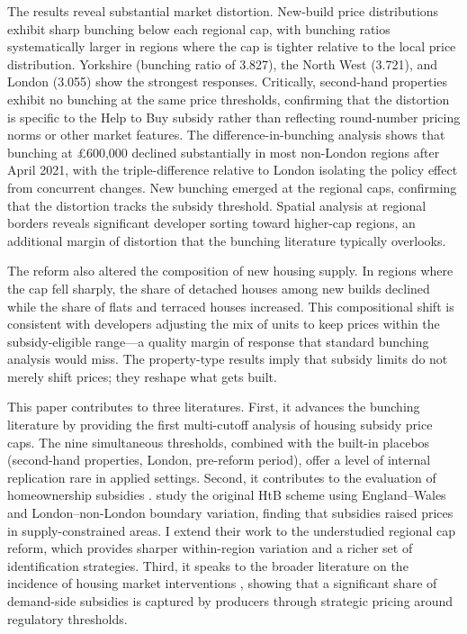 \documentclass[12pt]{article}
\begin{document}
The results reveal substantial market distortion. New-build price distributions exhibit sharp bunching below each regional cap, with bunching ratios systematically larger in regions where the cap is tighter relative to the local price distribution. Yorkshire (bunching ratio of 3.827), the North West (3.721), and London (3.055) show the strongest responses. Critically, second-hand properties exhibit no bunching at the same price thresholds, confirming that the distortion is specific to the Help to Buy subsidy rather than reflecting round-number pricing norms or other market features. The difference-in-bunching analysis shows that bunching at \pounds600,000 declined substantially in most non-London regions after April 2021, with the triple-difference relative to London isolating the policy effect from concurrent changes. New bunching emerged at the regional caps, confirming that the distortion tracks the subsidy threshold. Spatial analysis at regional borders reveals significant developer sorting toward higher-cap regions, an additional margin of distortion that the bunching literature typically overlooks.

The reform also altered the composition of new housing supply. In regions where the cap fell sharply, the share of detached houses among new builds declined while the share of flats and terraced houses increased. This compositional shift is consistent with developers adjusting the mix of units to keep prices within the subsidy-eligible range---a quality margin of response that standard bunching analysis would miss. The property-type results imply that subsidy limits do not merely shift prices; they reshape what gets built.

This paper contributes to three literatures. First, it advances the bunching literature \citep{kleven2016bunching, kleven2013using} by providing the first multi-cutoff analysis of housing subsidy price caps. The nine simultaneous thresholds, combined with the built-in placebos (second-hand properties, London, pre-reform period), offer a level of internal replication rare in applied settings. Second, it contributes to the evaluation of homeownership subsidies \citep{mian2009consequences, berger2020stimulating, carozzi2024help}. \citet{carozzi2024help} study the original HtB scheme using England--Wales and London--non-London boundary variation, finding that subsidies raised prices in supply-constrained areas. I extend their work to the understudied regional cap reform, which provides sharper within-region variation and a richer set of identification strategies. Third, it speaks to the broader literature on the incidence of housing market interventions \citep{best2018housing, besley2014stamp, autor2014housing}, showing that a significant share of demand-side subsidies is captured by producers through strategic pricing around regulatory thresholds.
\end{document}

